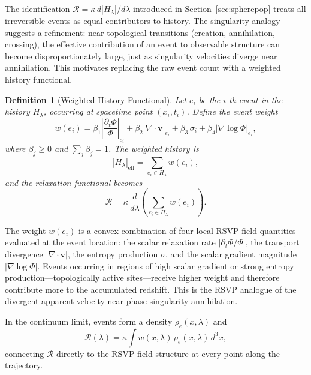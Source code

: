 \documentclass[12pt,a4paper]{article}
\newtheorem{definition}[theorem]{Definition}
\theoremstyle{remark}
\newcommand{\vv}{\mathbf{v}}
\newcommand{\Rcal}{\mathcal{R}}
\begin{document}
The identification $\Rcal = \kappa\,d|H_\lambda|/d\lambda$ introduced in
Section~\ref{sec:spherepop} treats all irreversible events as equal contributors
to history. The singularity analogy suggests a refinement: near topological
transitions (creation, annihilation, crossing), the effective contribution of
an event to observable structure can become disproportionately large, just as
singularity velocities diverge near annihilation. This motivates replacing the
raw event count with a weighted history functional.

\begin{definition}[Weighted History Functional]
Let $e_i$ be the $i$-th event in the history $H_\lambda$, occurring at
spacetime point $(x_i, t_i)$. Define the event weight
\begin{equation}
w(e_i) = \beta_1 \left|\frac{\partial_t\Phi}{\Phi}\right|_{e_i}
        + \beta_2 \left|\nabla\cdot\vv\right|_{e_i}
        + \beta_3 \,\sigma_i
        + \beta_4 \left|\nabla\log\Phi\right|_{e_i},
\label{eq:weight}
\end{equation}
where $\beta_j \ge 0$ and $\sum_j \beta_j = 1$. The weighted history is
\begin{equation}
|H_\lambda|_{\mathrm{eff}} = \sum_{e_i \in H_\lambda} w(e_i),
\end{equation}
and the relaxation functional becomes
\begin{equation}
\boxed{\Rcal = \kappa\,\frac{d}{d\lambda}\!\left(\sum_{e_i \in H_\lambda} w(e_i)\right).}
\label{eq:R_weighted}
\end{equation}
\end{definition}

The weight $w(e_i)$ is a convex combination of four local RSVP field quantities
evaluated at the event location: the scalar relaxation rate $|\partial_t\Phi/\Phi|$,
the transport divergence $|\nabla\cdot\vv|$, the entropy production $\sigma$,
and the scalar gradient magnitude $|\nabla\log\Phi|$. Events occurring in
regions of high scalar gradient or strong entropy production---topologically
active sites---receive higher weight and therefore contribute more to the
accumulated redshift. This is the RSVP analogue of the divergent apparent
velocity near phase-singularity annihilation.

In the continuum limit, events form a density $\rho_e(x,\lambda)$ and
\begin{equation}
\Rcal(\lambda) = \kappa\int w(x,\lambda)\,\rho_e(x,\lambda)\, d^3x,
\label{eq:R_continuum}
\end{equation}
connecting $\Rcal$ directly to the RSVP field structure at every point along
the trajectory.
\end{document}
